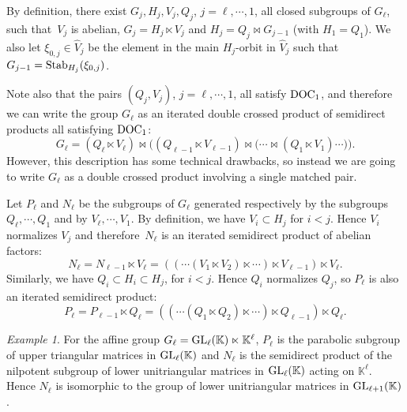 \documentclass[a4paper,11pt,reqno]{amsart}
\numberwithin{equation}{section}
\theoremstyle{remark}
\newtheorem{example}[theorem]{Example}
\theoremstyle{definition}
\newcommand{\K}{\mathbb K}
\begin{document}
By definition, there exist $G_j,H_{j},V_j,Q_j$, $j=\ell,\cdots,1$, all closed subgroups of $G_\ell$, such that~$V_j$ is abelian,
$G_j=H_{j}\ltimes V_j$ and  $H_j=Q_j\bowtie G_{j-1}$ (with $H_1=Q_1$). We also let $\xi_{0,j}\in\hat V_{j}$ be the  element in the main  $H_{j}$-orbit in $\hat V_j$
such that $G_{j-1}={\rm Stab}_{H_{j}}(\xi_{0,j})$.


Note also that  the pairs $(Q_j,V_j)$, $j=\ell,\cdots,1$, all
satisfy  ${\rm DOC}_1$, and
therefore we can write the group $G_\ell$
as an iterated double crossed product of semidirect products all satisfying ${\rm DOC}_1$:
\begin{equation}
\label{IDCP}
G_\ell=(Q_\ell\ltimes V_\ell)\bowtie\big((Q_{\ell-1}\ltimes V_{\ell-1})\bowtie\big(\cdots\bowtie(Q_1\ltimes V_1)\cdots\big)\big).
\end{equation}
However, this description has  some  technical drawbacks, so instead we are going
to write  $G_\ell$ as a double crossed product involving a  single matched pair.

Let $P_\ell$ and $N_\ell$ be the subgroups of $G_\ell$ generated respectively by the  subgroups $Q_\ell, \cdots, Q_1$ and
 by  $V_\ell, \cdots, V_1$.
By definition,  we have $V_i\subset H_j$ for $i<j$. Hence $V_i$ normalizes $V_j$ and therefore~$N_\ell$
is an iterated semidirect product of abelian factors:
$$
N_\ell=N_{\ell-1}\ltimes V_\ell=((\cdots(V_1\ltimes V_2)\ltimes\cdots)\ltimes V_{\ell-1})\ltimes V_\ell.
$$
Similarly, we have $Q_i\subset H_i\subset H_j$, for $i<j$. Hence $Q_i$ normalizes $Q_j$, so $P_\ell$
is also an iterated semidirect product:
$$
P_\ell=P_{\ell-1}\ltimes Q_\ell=((\cdots(Q_1\ltimes Q_2)\ltimes\cdots)\ltimes Q_{\ell-1})\ltimes Q_\ell.
$$
\begin{example}
For the affine group $G_\ell={\rm GL}_\ell(\K)\ltimes \K^\ell$, $P_\ell$ is the parabolic subgroup of  upper triangular matrices in ${\rm GL}_\ell(\K)$  and
 $N_\ell$   is the semidirect product of the nilpotent subgroup of lower unitriangular matrices in ${\rm GL}_\ell(\K)$ acting on $\K^\ell$.
 Hence $N_\ell$ is  isomorphic to the  group of lower unitriangular matrices in ${\rm GL}_{\ell+1}(\K)$.
  \end{example}
\end{document}
